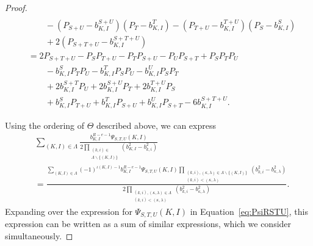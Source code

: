 \documentclass{amsart}
\theoremstyle{definition}
\theoremstyle{remark}
\begin{document}
\begin{proof}
\begin{align}
        \\ \nonumber &\quad\quad
            - (P_{S+U} - b_{K,I}^{S+U})(P_T - b_{K,I}^T)
            - (P_{T+U} - b_{K,I}^{T+U})(P_S - b_{K,I}^S)
        \\ \nonumber &\quad\quad
            + 2(P_{S+T+U} - b_{K,I}^{S+T+U})
    \\ \label{eq:PsiRSTU}
    &=    2P_{S+T+U} - P_S P_{T+U} - P_T P_{S+U} - P_U P_{S+T}
            + P_S P_T P_U
        \\ \nonumber &\quad\quad
            - b_{K,I}^S P_T P_U - b_{K,I}^T P_S P_U - b_{K,I}^U P_S P_T
        \\ \nonumber &\quad\quad
            + 2 b_{K,I}^{S+T} P_U + 2 b_{K,I}^{S+U} P_T + 2 b_{K,I}^{T+U} P_S
        \\ \nonumber &\quad\quad
            + b_{K,I}^{S} P_{T+U} + b_{K,I}^{T} P_{S+U} + b_{K,I}^{U} P_{S+T}
            - 6 b_{K,I}^{S+T+U}.
\end{align}

Using the ordering of $\Theta$ described above, we can express
\begin{align}
    \label{eq:lastPhiRSTU}
    &\sum\limits_{(K,I) \in \Lambda}
        \frac{b_{K,I}^{R - e - 1} \Psi_{S,T,U}(K,I)}
            {2\prod\limits_{\substack{(k,i)\in \\ \Lambda\smallsetminus \{(K,I)\} }}
                (b_{K,I}^2 - b_{k,i}^2) }
    \\ \nonumber &=
    \frac{ \sum\limits_{(K,I) \in \Lambda} (-1)^{\iota(K,I)-1} b_{K,I}^{R - e - 1} \Psi_{S,T,U}(K,I)
            \prod\limits_{\substack{(k,i),(\kappa,\lambda)\in\Lambda\smallsetminus \{(K,I)\} \\ (k,i) < (\kappa,\lambda) }}
                    (b_{k,i}^2 - b_{\kappa,\lambda}^2)}
                {2\prod\limits_{\substack{(k,i),(\kappa,\lambda)\in\Lambda \\ (k,i) < (\kappa,\lambda) }}
                    (b_{k,i}^2 - b_{\kappa,\lambda}^2) }.
\end{align}
Expanding over the expression for $\Psi_{S,T,U}(K,I)$ in Equation~\eqref{eq:PsiRSTU}, this expression can
be written as a sum of similar expressions, which we consider simultaneously.


\end{proof}
\end{document}
